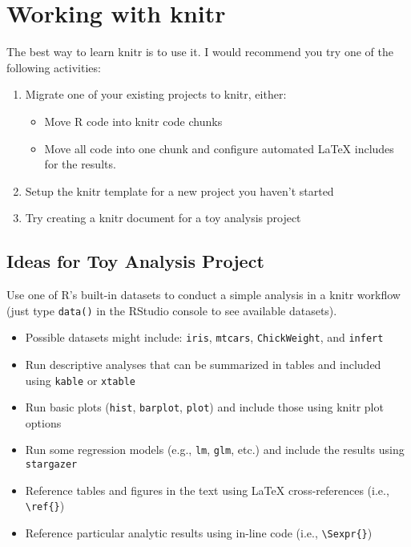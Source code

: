 \documentclass[11pt, a4paper]{article}
\begin{document}
\clearpage
\section*{Working with knitr}

The best way to learn knitr is to use it. I would recommend you try one of the following activities:

\begin{enumerate}
    \item Migrate one of your existing projects to knitr, either:
        \begin{itemize}
            \item Move R code into knitr code chunks
            \item Move all code into one chunk and configure automated \LaTeX{} includes for the results.
        \end{itemize}
    \item Setup the knitr template for a new project you haven't started
    \item Try creating a knitr document for a toy analysis project
\end{enumerate}

\vspace{1em}
\subsection*{Ideas for Toy Analysis Project}

Use one of R's built-in datasets to conduct a simple analysis in a knitr workflow (just type \texttt{data()} in the RStudio console to see available datasets). 

\begin{itemize}
\item Possible datasets might include: \texttt{iris}, \texttt{mtcars}, \texttt{ChickWeight}, and \texttt{infert}
\item Run descriptive analyses that can be summarized in tables and included using \texttt{kable} or \texttt{xtable}
\item Run basic plots (\texttt{hist}, \texttt{barplot}, \texttt{plot}) and include those using knitr plot options
\item Run some regression models (e.g., \texttt{lm}, \texttt{glm}, etc.) and include the results using \texttt{stargazer}
\item Reference tables and figures in the text using \LaTeX{} cross-references (i.e., \verb|\ref{}|)
\item Reference particular analytic results using in-line code (i.e., \verb|\Sexpr{}|)
\end{itemize}
\end{document}
